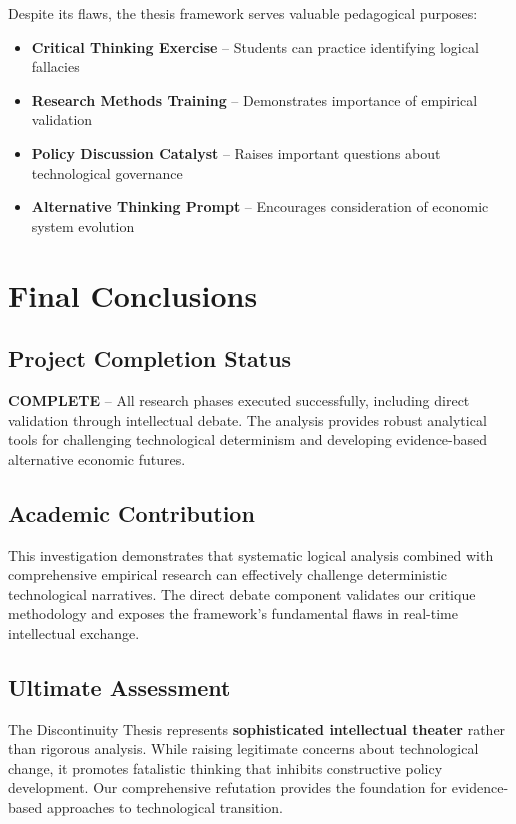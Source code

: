 \documentclass[11pt,a4paper]{article}
\newcommand{\emphasis}[1]{\textbf{\textcolor{primaryblue}{#1}}}
\newcommand{\status}[1]{\textcolor{successgreen}{\textbf{#1}}}
\begin{document}
Despite its flaws, the thesis framework serves valuable pedagogical purposes:

\begin{itemize}[leftmargin=*]
\item \textbf{Critical Thinking Exercise} -- Students can practice identifying logical fallacies
\item \textbf{Research Methods Training} -- Demonstrates importance of empirical validation
\item \textbf{Policy Discussion Catalyst} -- Raises important questions about technological governance
\item \textbf{Alternative Thinking Prompt} -- Encourages consideration of economic system evolution
\end{itemize}

\section{Final Conclusions}

\subsection{Project Completion Status}

\status{COMPLETE} -- All research phases executed successfully, including direct validation through intellectual debate. The analysis provides robust analytical tools for challenging technological determinism and developing evidence-based alternative economic futures.

\subsection{Academic Contribution}

This investigation demonstrates that systematic logical analysis combined with comprehensive empirical research can effectively challenge deterministic technological narratives. The direct debate component validates our critique methodology and exposes the framework's fundamental flaws in real-time intellectual exchange.

\subsection{Ultimate Assessment}

The Discontinuity Thesis represents \emphasis{sophisticated intellectual theater} rather than rigorous analysis. While raising legitimate concerns about technological change, it promotes fatalistic thinking that inhibits constructive policy development. Our comprehensive refutation provides the foundation for evidence-based approaches to technological transition.
\end{document}
